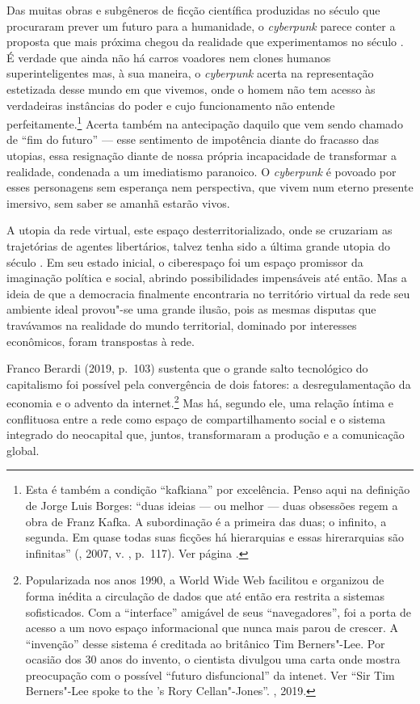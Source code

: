 Das muitas obras e subgêneros de ficção científica produzidas no século
 que procuraram prever um futuro para a humanidade, o \emph{cyberpunk}
parece conter a proposta que mais próxima chegou da realidade que experimentamos no
século . É verdade que ainda não há carros voadores nem clones
humanos superinteligentes mas, à sua maneira, o \emph{cyberpunk} acerta
na representação estetizada desse mundo em que vivemos, onde o homem não
tem acesso às verdadeiras instâncias do poder e cujo funcionamento não
entende perfeitamente.\footnote{Esta é também a condição ``kafkiana''
  por excelência. Penso aqui na definição de Jorge Luis Borges: ``duas
  ideias --- ou melhor --- duas obsessões regem a obra de Franz Kafka. A
  subordinação é a primeira das duas; o infinito, a segunda. Em quase
  todas suas ficções há hierarquias e essas hirerarquias são infinitas''
  (, 2007, v. , p.~117). Ver página \pageref{comando}.} Acerta também na antecipação daquilo que vem sendo chamado de
``fim do futuro'' --- esse sentimento de impotência diante do fracasso
das utopias, essa resignação diante de nossa própria incapacidade de
transformar a realidade, condenada a um imediatismo paranoico. O
\emph{cyberpunk} é povoado por esses personagens sem esperança nem
perspectiva, que vivem num eterno presente imersivo, sem saber se amanhã
estarão vivos.

A utopia da rede virtual, este espaço desterritorializado, onde se
cruzariam as trajetórias de agentes libertários, talvez tenha sido a
última grande utopia do século . Em seu estado inicial, o ciberespaço
foi um espaço promissor da imaginação política e social, abrindo
possibilidades impensáveis até então. Mas a ideia de que a democracia finalmente
encontraria no território virtual da rede seu ambiente ideal
provou"-se uma grande ilusão, pois as mesmas disputas que travávamos na
realidade do mundo territorial, dominado por interesses econômicos,
foram transpostas à rede.

Franco Berardi (2019, p.~103) sustenta que o grande salto tecnológico do
capitalismo foi possível pela convergência de dois fatores: a
desregulamentação da economia e o advento da internet.\footnote{Popularizada
  nos anos 1990, a World Wide Web facilitou e organizou de forma inédita
  a circulação de dados que até então era restrita a sistemas
  sofisticados. Com a ``interface'' amigável de seus ``navegadores'',
  foi a porta de acesso a um novo espaço informacional que nunca mais
  parou de crescer. A ``invenção'' desse sistema é creditada ao
  britânico Tim Berners"-Lee. Por ocasião dos 30 anos do invento, o
  cientista divulgou uma carta onde mostra preocupação com o possível
  ``futuro disfuncional'' da intenet. Ver ``Sir Tim Berners"-Lee spoke to
  the 's Rory Cellan"-Jones''. , 2019.} Mas há, segundo ele, uma relação íntima e
conflituosa entre a rede como espaço de compartilhamento social e o
sistema integrado do neocapital que, juntos, transformaram a produção e
a comunicação global.

